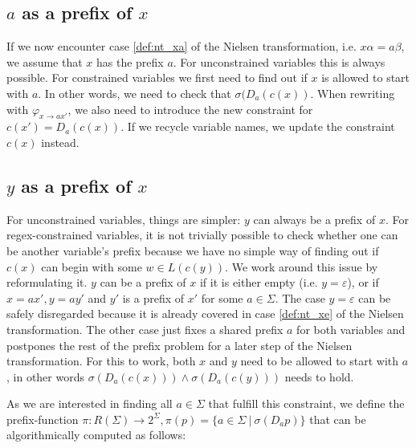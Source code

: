 \subsection{$a$ as a prefix of $x$}
If we now encounter case \ref{def:nt_xa} of the Nielsen transformation, i.e. $x\alpha = a\beta$, we assume that $x$ has the prefix $a$. For unconstrained variables this is always possible. For constrained variables we first need to find out if $x$ is allowed to start with $a$. In other words, we need to check that $\sigma(D_a(c(x))$. When rewriting with $\varphi_{x \rightarrow ax'}$, we also need to introduce the new constraint for $c(x') = D_a(c(x))$. If we recycle variable names, we update the constraint $c(x)$ instead.

\subsection{$y$ as a prefix of $x$} \label{ss_y_prefix_x}
For unconstrained variables, things are simpler: $y$ can always be a prefix of $x$.
For regex-constrained variables, it is not trivially possible to check whether one can be another variable's prefix because we have no simple way of finding out if $c(x)$ can begin with some $w \in L(c(y))$. We work around this issue by reformulating it. $y$ can be a prefix of $x$ if it is either empty (i.e. $y = \varepsilon$), or if $x = ax', y = ay'$ and $y'$ is a prefix of $x'$ for some $a \in \Sigma$. The case $y = \varepsilon$ can be safely disregarded because it is already covered in case \ref{def:nt_xe} of the Nielsen transformation. The other case just fixes a shared prefix $a$ for both variables and postpones the rest of the prefix problem for a later step of the Nielsen transformation.
For this to work, both $x$ and $y$ need to be allowed to start with $a$, in other words $\sigma(D_a(c(x))) \land \sigma(D_a(c(y)))$ needs to hold.

As we are interested in finding all $a \in \Sigma$ that fulfill this constraint, we define the prefix-function $\pi: R(\Sigma) \rightarrow 2^\Sigma, \pi(p) = \{a \in \Sigma\:|\:\sigma(D_ap)\}$ that can be algorithmically computed as follows:

